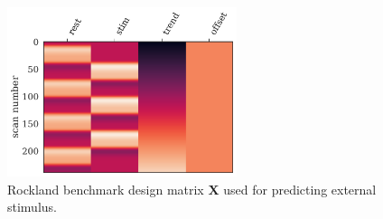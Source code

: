 \begin{figure}[t]
  \centering
  \includegraphics[width=0.6\textwidth]{fig/rockland/CHECKERBOARD645/prediction_benchmark/design_matrix_nilearn}
  \caption{
    Rockland benchmark design matrix $\mathbf{X}$ used for predicting external stimulus.
  }
  \label{fig:rockland-design-matrix}
\end{figure}


